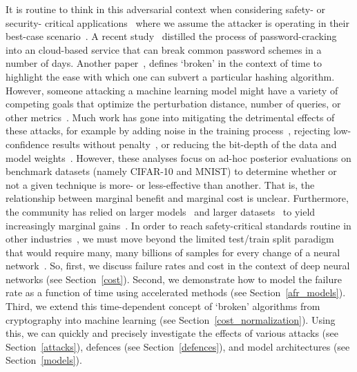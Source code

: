 It is routine to think in this adversarial context when considering safety- or security- critical applications~\cite{ai_medical_imaging,ai_security,ai_prison,ai_aviation,ai_luggage} where we assume the attacker is operating in their best-case scenario~\cite{leurent2020sha,kamal2017study,madry2017towards,pixelattack,deepfool,croce_reliable_2020}. A recent study~\cite{kamal2017study} distilled the process of password-cracking into an cloud-based service that can break common password schemes in a number of days. Another paper~\cite{leurent2020sha}, defines `broken' in the context of time to highlight the ease with which one can subvert a particular hashing algorithm. However, someone attacking a machine learning model might have a variety of competing goals that optimize the perturbation distance, number of queries, or other metrics~\cite{madry2017towards,hopskipjump,pixelattack,fgm,deepfool}. Much work has gone into mitigating the detrimental effects of these attacks, for example by adding noise in the training process~\cite{gauss_aug,gauss_out}, rejecting low-confidence results without penalty~\cite{high_conf}, or reducing the bit-depth of the data and model weights~\cite{feature_squeezing}. However, these analyses focus on ad-hoc posterior evaluations on benchmark datasets (namely CIFAR-10 and MNIST) to determine whether or not a given technique is more- or less-effective than another. That is, the relationship between marginal benefit and marginal cost is unclear. Furthermore, the community has relied on larger models~\cite{desislavov2021compute} and larger datasets~\cite{desislavov2021compute,bailly2022effects} to yield increasingly marginal gains~\cite{sun2017revisiting}. In order to reach safety-critical standards routine in other industries~\cite{iso26262,IEC61508,IEC62034}, we must move beyond the limited test/train split paradigm that would require many, many billions of samples for every change of a neural network~\cite{meyers}. So, first, we discuss failure rates and cost in the context of deep neural networks (see Section~\ref{cost}). Second, we demonstrate how to model the failure rate as a function of time  using accelerated methods (see Section~\ref{afr_models}). Third, we extend this time-dependent concept of `broken' algorithms from cryptography into machine learning (see Section~\ref{cost_normalization}). Using this, we can quickly and precisely investigate the effects of various attacks (see Section~\ref{attacks}), defences (see Section~\ref{defences}), and model architectures (see Section~\ref{models}).


